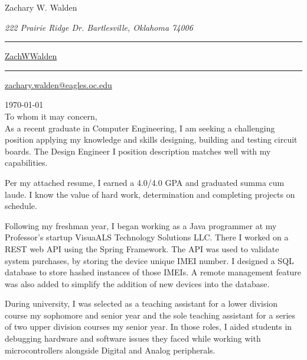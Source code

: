 \documentclass{article}
\newcommand\mybar{\kern1pt\rule[-\dp\strutbox]{.8pt}{\baselineskip}\kern1pt}
\begin{document}
\begin{center}
	\begin{Huge}
		Zachary W. Walden\\
	\end{Huge}
	\begin{large}
		\textsl{222 Prairie Ridge Dr. Bartlesville, Oklahoma 74006}\\
	\end{large}
	\begin{normalsize}
		 \mybar { } \faGithub \href{https://github.com/ZachWWalden}{ ZachWWalden}
		\mybar { }\faEnvelope\href{mailto::zachary.walden@eagles.oc.edu}{ zachary.walden@eagles.oc.edu}
	\end{normalsize}
\end{center}

\begin{adjustwidth}{70pt}{70pt}
\begin{spacing}{1.25}
\vspace*{1.5cm}

\today
\vspace*{.6cm}
\\To whom it may concern,\\

As a recent graduate in Computer Engineering, I am seeking a challenging position applying my knowledge
and  skills designing, building and testing circuit boards. The Design Engineer I position description
matches well with my capabilities.

Per my attached resume, I earned a 4.0/4.0 GPA and graduated summa cum laude. I know the value of hard
work, determination and completing projects on schedule.

Following my freshman year, I began working as a Java programmer at my Professor's startup VisuaALS Technology Solutions LLC. There I worked on a REST web API using the Spring Framework. The API was used to validate system purchases, by storing the device unique IMEI number. I designed a SQL database to store hashed instances of those IMEIs. A remote management feature was also added to simplify the addition of new devices into the database.

During university, I was selected as a teaching assistant for a lower division course my sophomore and senior year and the sole teaching assistant for a series of two upper division courses my senior year.
In those roles, I aided students in debugging hardware and software issues they faced while working with microcontrollers alongside Digital and Analog peripherals.


\end{spacing}
\end{adjustwidth}
\end{document}
